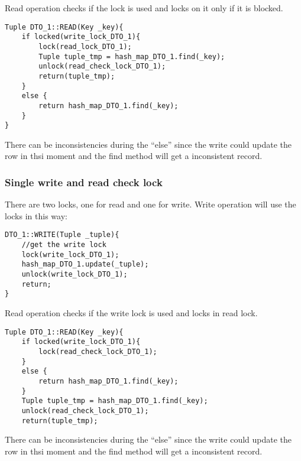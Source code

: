 \documentclass[a4paper]{article}
\begin{document}
Read operation checks if the lock is used and locks on it only if it is
blocked.

\begin{verbatim}
Tuple DTO_1::READ(Key _key){
    if locked(write_lock_DTO_1){
        lock(read_lock_DTO_1);        
        Tuple tuple_tmp = hash_map_DTO_1.find(_key);
        unlock(read_check_lock_DTO_1);
        return(tuple_tmp);
    }
    else {
        return hash_map_DTO_1.find(_key);
    }
}
\end{verbatim}

There can be inconsistencies during the ``else'' since the write could update
the row in thsi moment and the find method will get a inconsistent record.

\subsubsection{Single write and read check lock}
There are two locks, one for read and one for write. Write operation will use
the locks in this way:

\begin{verbatim}
DTO_1::WRITE(Tuple _tuple){
    //get the write lock
    lock(write_lock_DTO_1);
    hash_map_DTO_1.update(_tuple);
    unlock(write_lock_DTO_1);
    return;
}
\end{verbatim}

Read operation checks if the write lock is used and locks in read lock.

\begin{verbatim}
Tuple DTO_1::READ(Key _key){
    if locked(write_lock_DTO_1){
        lock(read_check_lock_DTO_1);
    }
    else {
        return hash_map_DTO_1.find(_key);
    }
    Tuple tuple_tmp = hash_map_DTO_1.find(_key);
    unlock(read_check_lock_DTO_1);
    return(tuple_tmp);
\end{verbatim}

There can be inconsistencies during the ``else'' since the write could update
the row in thsi moment and the find method will get a inconsistent record.
\end{document}

